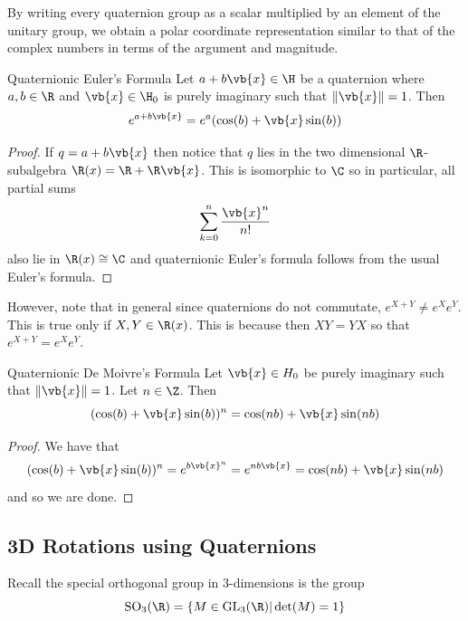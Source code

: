 \documentclass[a4paper]{article}
\begin{document}
By writing every quaternion group as a scalar multiplied by an element of the unitary group, we obtain a polar coordinate representation similar to that of the complex numbers in terms of the argument and magnitude. 

\begin{prp}{Quaternionic Euler's Formula}{} Let $a+b\vb{x}\in\H$ be a quaternion where $a,b\in\R$ and $\vb{x}\in\H_0$ is purely imaginary such that $\|\vb{x}\|=1$. Then $$e^{a+b\vb{x}}=e^a(\cos(b)+\vb{x}\sin(b))$$ 
\begin{proof}
If $q=a+b\vb{x}$ then notice that $q$ lies in the two dimensional $\R$-subalgebra $\R(x)=\R+\R\vb{x}$. This is isomorphic to $\C$ so in particular, all partial sums $$\sum_{k=0}^n\frac{\vb{x}^n}{n!}$$ also lie in $\R(x)\cong\C$ and quaternionic Euler's formula follows from the usual Euler's formula. 
\end{proof}
\end{prp}

However, note that in general since quaternions do not commutate, $e^{X+Y}\neq e^Xe^Y$. This is true only if $X,Y\in\R(x)$. This is because then $XY=YX$ so that $e^{X+Y}=e^Xe^Y$. 

\begin{prp}{Quaternionic De Moivre's Formula}{} Let $\vb{x}\in H_0$ be purely imaginary such that $\|\vb{x}\|=1$. Let $n\in\Z$. Then $$(\cos(b)+\vb{x}\sin(b))^n=\cos(nb)+\vb{x}\sin(nb)$$ 
\begin{proof}
We have that $$(\cos(b)+\vb{x}\sin(b))^n=e^{{b\vb{x}}^n}=e^{nb\vb{x}}=\cos(nb)+\vb{x}\sin(nb)$$ and so we are done. 
\end{proof}
\end{prp}

\subsection{3D Rotations using Quaternions}
Recall the special orthogonal group in $3$-dimensions is the group $$\text{SO}_3(\R)=\{M\in\text{GL}_3(\R)|\det(M)=1\}$$
\end{document}
